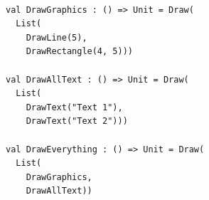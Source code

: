 \begin{lstlisting}[caption={Aplicação do \textit{Composite} Funcional.},label=fpcompositeapp]
    
val DrawGraphics : () => Unit = Draw(
  List(
    DrawLine(5),
    DrawRectangle(4, 5)))

val DrawAllText : () => Unit = Draw(
  List(
    DrawText("Text 1"),
    DrawText("Text 2")))

val DrawEverything : () => Unit = Draw(
  List(
    DrawGraphics,
    DrawAllText))
    
\end{lstlisting}
